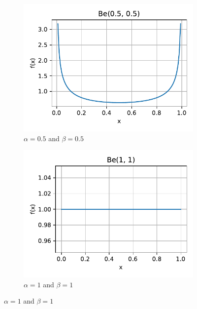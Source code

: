 \begin{figure}[H]
    \centering
    \begin{subfigure}{0.3\textwidth}
        \centering
        \includegraphics[width=1\textwidth]{resources/figures/q1-beta_distr-alpha_0.5-beta_0.5.pdf}
        \caption{$\alpha = 0.5$ and $\beta = 0.5$}
        \label{q1-beta-distr-a_0.5-b_0.5}
    \end{subfigure}
    \hfill
    \begin{subfigure}{0.3\textwidth}
        \centering
        \includegraphics[width=1\textwidth]{resources/figures/q1-beta_distr-alpha_1-beta_1.pdf}
        \caption{$\alpha = 1$ and $\beta = 1$}
        \label{q1-beta-distr-a_1-b_1}
    \end{subfigure}

\end{figure}
